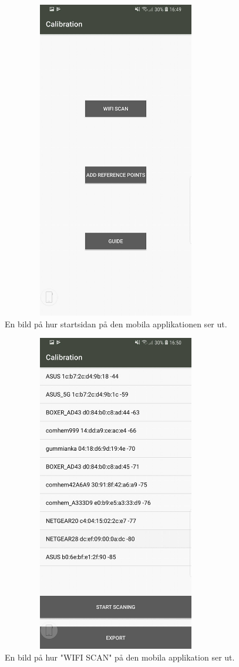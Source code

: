 \documentclass[swedish, a4paper,12pt]{article}
\begin{document}
\begin{figure}[H]
  \centering
  \includegraphics[width=10cm, height=14cm]{media/mob_main.jpg}
  \caption{En bild på hur startsidan på den mobila applikationen ser ut.}
  \label{fig:mob_main}
\end{figure}

\begin{figure}[H]
  \centering
  \includegraphics[width=10cm, height=14cm]{media/mob_scan_cal.jpg}
  \caption{En bild på hur "WIFI SCAN" på den mobila applikation ser ut.}
  \label{fig:mob_scan_cal}
\end{figure}
\end{document}
